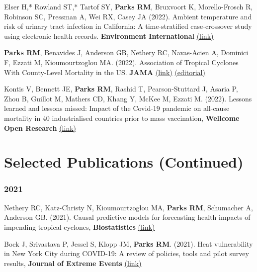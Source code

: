 {\noindent Elser H,* Rowland ST,* Tartof SY, \textbf{Parks RM}, Bruxvoort K, Morello-Frosch R, Robinson SC, Pressman A, Wei RX, Casey JA (2022). Ambient temperature and risk of urinary tract infection in California: A time-stratified case-crossover study using electronic health records. \textbf{Environment International} \href{https://www.sciencedirect.com/science/article/pii/S0160412022002306}{(link)} \smallskip

\noindent \textbf{Parks RM}, Benavides J, Anderson GB, Nethery RC, Navas-Acien A, Dominici F, Ezzati M, Kioumourtzoglou MA. (2022). Association of Tropical Cyclones With County-Level Mortality in the US. \textbf{JAMA} \href{https://jamanetwork.com/journals/jama/fullarticle/2789661}{(link)} \href{https://jamanetwork.com/journals/jama/fullarticle/2789676}{(editorial)} \smallskip

\noindent Kontis V, Bennett JE, \textbf{Parks RM}, Rashid T, Pearson-Stuttard J, Asaria P, Zhou B, Guillot M, Mathers CD, Khang Y, McKee M, Ezzati M. (2022). Lessons learned and lessons missed: Impact of the Covid-19 pandemic on all-cause mortality in 40 industrialised countries prior to mass vaccination, \textbf{Wellcome Open Research} \href{https://wellcomeopenresearch.org/articles/6-279/v2}{(link)} %


\newpage

\section*{Selected Publications (Continued)}

\subsubsection*{2021}

\noindent Nethery RC, Katz-Christy N, Kioumourtzoglou MA, \textbf{Parks RM}, Schumacher A, Anderson GB. (2021). Causal predictive models for forecasting health impacts of impending tropical cyclones, \textbf{Biostatistics} \href{https://academic.oup.com/biostatistics/advance-article/doi/10.1093/biostatistics/kxab047/6485226?guestAccessKey=378fb8f6-102d-4b21-a93d-b0a01353c19f#}{(link)} \smallskip

\noindent Bock J, Srivastava P, Jessel S, Klopp JM, \textbf{Parks RM}. (2021). Heat vulnerability in New York City during COVID-19: A review of policies, tools and pilot survey results, \textbf{Journal of Extreme Events} \href{https://www.worldscientific.com/doi/10.1142/S2345737621500159}{(link)} \smallskip

}
